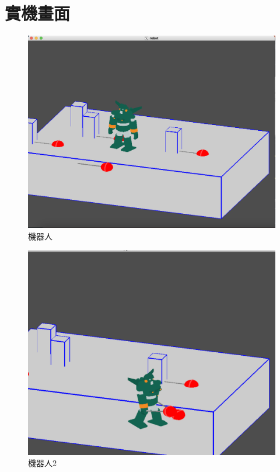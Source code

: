 \documentclass[a4,12pt]{article}
\begin{document}
    \section{實機畫面}
    \begin{figure}[H] 
    \centering
    
    \includegraphics[scale = 0.3]{robot1.png}
    \caption{機器人}
    \end{figure}
    \begin{figure}[H] 
        \centering
       
    \includegraphics[scale = 0.3]{robot2.png}
    \caption{機器人2}
    \end{figure}
    
\end{document}
